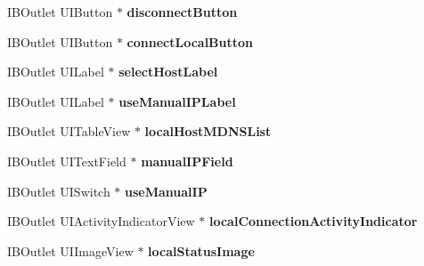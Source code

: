\begin{DoxyCompactItemize}
\item 
\hypertarget{interface_m_d_i_o_s_settings_view_controller_ad840cd3c4614c8100ad50f4f77f57dd9}{I\-B\-Outlet U\-I\-Button $\ast$ {\bfseries disconnect\-Button}}\label{interface_m_d_i_o_s_settings_view_controller_ad840cd3c4614c8100ad50f4f77f57dd9}

\item 
\hypertarget{interface_m_d_i_o_s_settings_view_controller_aa26d29032b0aac9285c9cf7f079ceafe}{I\-B\-Outlet U\-I\-Button $\ast$ {\bfseries connect\-Local\-Button}}\label{interface_m_d_i_o_s_settings_view_controller_aa26d29032b0aac9285c9cf7f079ceafe}

\item 
\hypertarget{interface_m_d_i_o_s_settings_view_controller_ac5389e5e348f0cf9dc604429d14fcfff}{I\-B\-Outlet U\-I\-Label $\ast$ {\bfseries select\-Host\-Label}}\label{interface_m_d_i_o_s_settings_view_controller_ac5389e5e348f0cf9dc604429d14fcfff}

\item 
\hypertarget{interface_m_d_i_o_s_settings_view_controller_ace5cd0bda05aa137630e4830681b83ad}{I\-B\-Outlet U\-I\-Label $\ast$ {\bfseries use\-Manual\-I\-P\-Label}}\label{interface_m_d_i_o_s_settings_view_controller_ace5cd0bda05aa137630e4830681b83ad}

\item 
\hypertarget{interface_m_d_i_o_s_settings_view_controller_a90d6d3537c2111179c95ffce28629022}{I\-B\-Outlet U\-I\-Table\-View $\ast$ {\bfseries local\-Host\-M\-D\-N\-S\-List}}\label{interface_m_d_i_o_s_settings_view_controller_a90d6d3537c2111179c95ffce28629022}

\item 
\hypertarget{interface_m_d_i_o_s_settings_view_controller_a02a737e4b849b157291c1976d53b5974}{I\-B\-Outlet U\-I\-Text\-Field $\ast$ {\bfseries manual\-I\-P\-Field}}\label{interface_m_d_i_o_s_settings_view_controller_a02a737e4b849b157291c1976d53b5974}

\item 
\hypertarget{interface_m_d_i_o_s_settings_view_controller_a73848a5e69bebf3374db9d827a14750c}{I\-B\-Outlet U\-I\-Switch $\ast$ {\bfseries use\-Manual\-I\-P}}\label{interface_m_d_i_o_s_settings_view_controller_a73848a5e69bebf3374db9d827a14750c}

\item 
\hypertarget{interface_m_d_i_o_s_settings_view_controller_a87f2473db187f5c41a1d5769e5a718da}{I\-B\-Outlet U\-I\-Activity\-Indicator\-View $\ast$ {\bfseries local\-Connection\-Activity\-Indicator}}\label{interface_m_d_i_o_s_settings_view_controller_a87f2473db187f5c41a1d5769e5a718da}

\item 
\hypertarget{interface_m_d_i_o_s_settings_view_controller_ab08bc57cb054c252a709c294123113e1}{I\-B\-Outlet U\-I\-Image\-View $\ast$ {\bfseries local\-Status\-Image}}\label{interface_m_d_i_o_s_settings_view_controller_ab08bc57cb054c252a709c294123113e1}

\end{DoxyCompactItemize}


